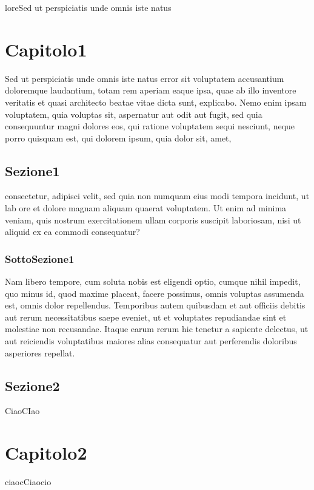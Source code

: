 loreSed ut perspiciatis unde omnis iste natus

\chapter{Capitolo1}

Sed ut perspiciatis unde omnis iste natus error sit voluptatem accusantium doloremque laudantium, totam rem aperiam eaque ipsa, quae ab illo inventore veritatis et quasi architecto beatae vitae dicta sunt, explicabo. Nemo enim ipsam voluptatem, quia voluptas sit, aspernatur aut odit aut fugit, sed quia consequuntur magni dolores eos, qui ratione voluptatem sequi nesciunt, neque porro quisquam est, qui dolorem ipsum, quia dolor sit, amet,

\section{Sezione1}

consectetur, adipisci velit, sed quia non numquam eius modi tempora incidunt, ut lab
ore et dolore magnam aliquam quaerat voluptatem. Ut enim ad minima veniam, quis nostrum 
exercitationem ullam corporis suscipit laboriosam, nisi ut aliquid ex ea commodi consequatur?


\subsection{SottoSezione1}
 
Nam libero tempore, cum soluta nobis est eligendi optio, cumque nihil impedit, quo minus id, quod maxime placeat, facere possimus, omnis voluptas assumenda est, omnis dolor repellendus. Temporibus autem quibusdam et aut officiis debitis aut rerum necessitatibus saepe eveniet, ut et voluptates repudiandae sint et molestiae non recusandae. Itaque earum rerum hic tenetur a sapiente delectus, ut aut reiciendis voluptatibus maiores alias consequatur aut perferendis doloribus asperiores repellat. 

\section{Sezione2}
CiaoCIao

\chapter{Capitolo2}


ciaocCiaocio